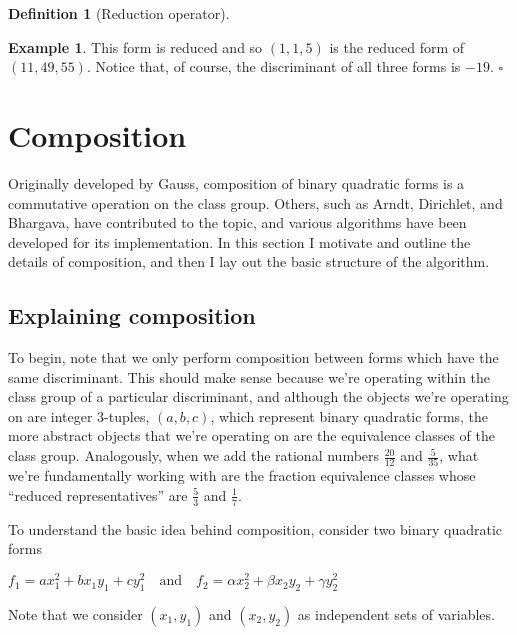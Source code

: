 \documentclass{article}
\theoremstyle{definition}
\newtheorem{definition}{Definition}[section]
\theoremstyle{theorem}
\theoremstyle{example}
\newtheorem{example}{Example}[section]
\theoremstyle{corollary}
\begin{document}
\begin{definition}[Reduction operator]
\begin{example}
\bigskip

This form is reduced and so \((1, 1, 5)\) is the reduced form of \((11, 49, 55)\). Notice that, of course, the discriminant of all three forms is \(-19\). \(\square\)

\end{example}





\bigskip




\section{Composition}

\bigskip

Originally developed by Gauss, composition of binary quadratic forms is a commutative operation on the class group. Others, such as Arndt, Dirichlet, and Bhargava, have contributed to the topic, and various algorithms have been developed for its implementation. In this section I motivate and outline the details of composition, and then I lay out the basic structure of the algorithm.

\bigskip

\subsection{Explaining composition}

\bigskip

To begin, note that we only perform composition between forms which have the same discriminant. This should make sense because we're operating within the class group of a particular discriminant, and although the objects we're operating on are integer 3-tuples, \((a, b, c)\), which represent binary quadratic forms, the more abstract objects that we're operating on are the equivalence classes of the class group. Analogously, when we add the rational numbers \(\frac{20}{12}\) and \(\frac{5}{35}\), what we're fundamentally working with are the fraction equivalence classes whose ``reduced representatives'' are \(\frac{5}{3}\) and \(\frac{1}{7}\).

\bigskip

To understand the basic idea behind composition, consider two binary quadratic forms
\begin{center}
\(f_{1} = a x_{1}^{2} + b x_{1} y_{1} + c y_{1}^{2} \quad \textrm{and} \quad f_{2} = \alpha x_{2}^{2} + \beta x_{2} y_{2} + \gamma y_{2}^{2}\)
\end{center}
Note that we consider \((x_{1}, y_{1})\) and \((x_{2}, y_{2})\) as independent sets of variables.


\end{definition}
\end{document}

